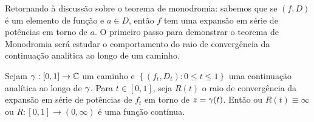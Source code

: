     Retornando à discussão sobre o teorema de monodromia: sabemos que se $(f,D)$ é
    um elemento de função e $a\in D$, então $f$ tem uma expansão em série de potências
    em torno de $a$. O primeiro passo para demonstrar o teorema de Monodromia será
    estudar o comportamento do raio de convergência da continuação analítica ao longo
    de um caminho.

    \begin{lema}
    \label{lema-raio-convergencia-continuo}
        Sejam $\gamma: [0,1]\to\mathbb{C}$ um caminho e 
        $\left\{ (f_t, D_t): 0\leq t\leq 1 \right\}$ uma continuação analítica ao longo de
        $\gamma$. Para $t\in[0,1]$, seja $R(t)$ o raio de convergência da expansão em 
        série de potências de $f_t$ em torno de $z=\gamma(t)$. Então ou $R(t) \equiv\infty$
        ou $R: [0,1]\to (0, \infty)$ é uma função contínua.
    \end{lema}

